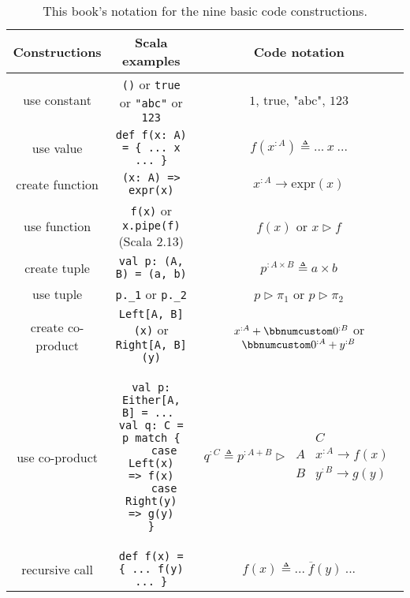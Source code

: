 \begin{table}
\begin{centering}
\begin{tabular}{|c|c|c|}
\hline 
\textbf{\small{}Constructions} & \textbf{\small{}Scala examples} & \textbf{\small{}Code notation}\tabularnewline
\hline 
\hline 
{\small{}use constant} & {\small{}}\lstinline!()!{\small{} or }\lstinline!true!{\small{}
or }\lstinline!"abc"!{\small{} or }\lstinline!123! & {\small{}$1$, $\text{true}$, $\text{"abc"}$, $123$}\tabularnewline
\hline 
{\small{}use value} & {\small{}}\lstinline!def f(x: A) = { ... x ... }! & {\small{}$f(x^{:A})\triangleq...~x~...$}\tabularnewline
\hline 
{\small{}create function} & {\small{}}\lstinline!(x: A) => expr(x)! & {\small{}$x^{:A}\rightarrow\text{expr}\left(x\right)$}\tabularnewline
\hline 
{\small{}use function} & {\small{}}\lstinline!f(x)!{\small{} or }\lstinline!x.pipe(f)!{\small{}
(Scala 2.13)} & {\small{}$f(x)$ or $x\triangleright f$}\tabularnewline
\hline 
{\small{}create tuple} & {\small{}}\lstinline!val p: (A, B) = (a, b)! & {\small{}$p^{:A\times B}\triangleq a\times b$}\tabularnewline
\hline 
{\small{}use tuple} & {\small{}}\lstinline!p._1!{\small{} or }\lstinline!p._2! & {\small{}$p\triangleright\pi_{1}$ or $p\triangleright\pi_{2}$}\tabularnewline
\hline 
{\small{}create co-product} & {\small{}}\lstinline!Left[A, B](x)!{\small{} or }\lstinline!Right[A, B](y)! & {\small{}$x^{:A}+\bbnum 0^{:B}$ or $\bbnum 0^{:A}+y^{:B}$}\tabularnewline
\hline 
{\small{}use co-product} & {\small{}\hspace*{-0.013\linewidth}}%
\begin{minipage}[c][1\totalheight][b]{0.33\columnwidth}%
{\small{}\vspace{0.28\baselineskip}
}
\begin{lstlisting}
val p: Either[A, B] = ... 
val q: C = p match {
    case Left(x)   => f(x)
    case Right(y)  => g(y)
}
\end{lstlisting}
{\small{}\vspace{-0.1\baselineskip}
}%
\end{minipage}{\small{} \hspace*{-0.009\linewidth}} & {\small{}$q^{:C}\triangleq p^{:A+B}\triangleright\,\begin{array}{|c||c|}
 & C\\
\hline A & x^{:A}\rightarrow f(x)\\
B & y^{:B}\rightarrow g(y)
\end{array}$}\tabularnewline
\hline 
{\small{}recursive call} & {\small{}}\lstinline!def f(x) = { ... f(y) ... }! & {\small{}$f(x)\triangleq...~\overline{f}(y)~...$}\tabularnewline
\hline 
\end{tabular}
\par\end{centering}
\caption{This book\textsf{'}s notation for the nine basic code constructions.\label{tab:Mathematical-notation-for-basic-code-constructions}}
\end{table}


